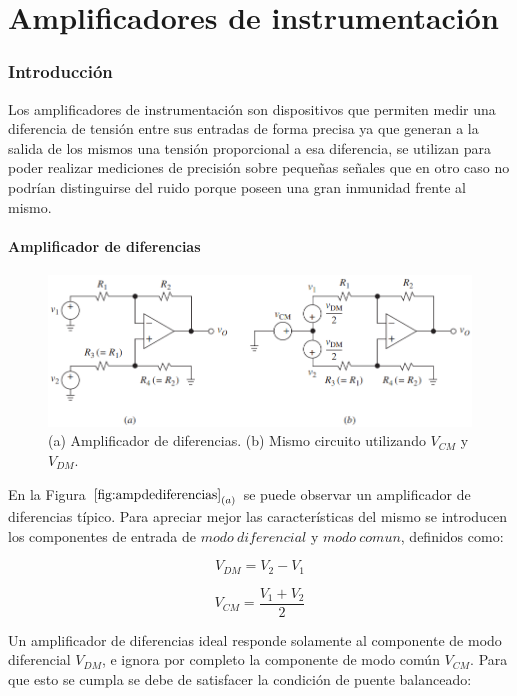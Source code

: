 \documentclass[11pt, a4paper]{article}
\begin{document}
\part{Amplificadores de instrumentación}
\section{Introducción}
	Los amplificadores de instrumentación son dispositivos que permiten medir una diferencia de tensión entre sus entradas de forma precisa ya que generan a la salida de los mismos una tensión proporcional a esa diferencia, se utilizan para poder realizar mediciones de precisión sobre pequeñas señales que en otro caso no podrían distinguirse del ruido porque poseen una gran inmunidad frente al mismo.
	
\subsection{Amplificador de diferencias}

\begin{figure}[H]
\centering
\includegraphics[scale=0.5]{ampdediferencias.png}
\caption{(a) Amplificador de diferencias. (b) Mismo circuito utilizando $V_{CM}$ y $V_{DM}$.}
\label{fig:ampdediferencias}
\end{figure}

	En la Figura $\ref{fig:ampdediferencias}_{(a)}$ se puede observar un amplificador de diferencias típico.
Para apreciar mejor las características del mismo se introducen los componentes de entrada de $\mathit{modo \ diferencial}$ y $\mathit{modo \ comun}$, definidos como:

\begin{equation}
\label{eq:VDM}
V_{DM} = V_2 - V_1
\end{equation}

\begin{equation}
\label{eq:VCM}
V_{CM} = \dfrac{V_1 + V_2}{2}
\end{equation}

	Un amplificador de diferencias ideal responde solamente al componente de modo diferencial $V_{DM}$, e ignora por completo la componente de modo común $V_{CM}$. Para que esto se cumpla se debe de satisfacer la condición de puente balanceado:
	
\end{document}

